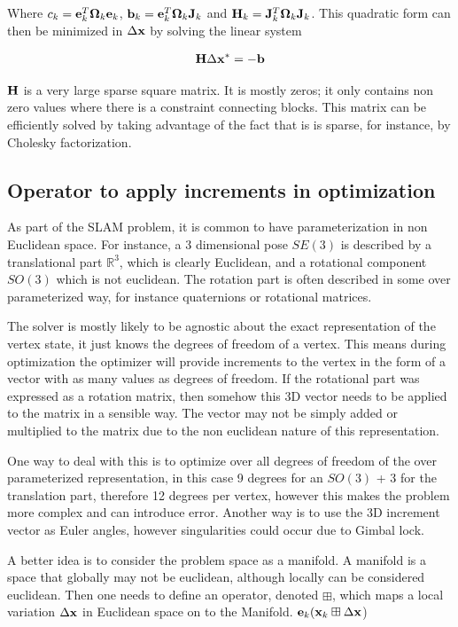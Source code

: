 Where $c_k = \mathbf e_k^T \mathbf \Omega_k \mathbf e_k$, $\mathbf b_k = \mathbf e_k^T \mathbf \Omega_k \mathbf J_k$ and $\mathbf H_k = \mathbf J_k^T \mathbf \Omega_k \mathbf J_k$. This quadratic form can then be minimized in $\Delta \mathbf x$ by solving the linear system

\begin{align}
   \mathbf H \Delta \mathbf x^* = -\mathbf b
\end{align}

$\mathbf H$ is a very large sparse square matrix.  It is mostly zeros; it only contains non zero values where there is a constraint connecting blocks.  This matrix can be efficiently solved by taking advantage of the fact that is is sparse, for instance, by Cholesky factorization.

\subsection{Operator to apply increments in optimization}
As part of the SLAM problem, it is common to have parameterization in non Euclidean space.  For instance, a 3 dimensional pose $SE(3)$ is described by a translational part $\mathbb{R}^3$, which is clearly Euclidean, and a rotational component $SO(3)$ which is not euclidean.  The rotation part is often described in some over parameterized way, for instance quaternions or rotational matrices.  

The solver is mostly likely to be agnostic about the exact representation of the vertex state, it just knows the degrees of freedom of a vertex.  This means during optimization the optimizer will provide increments to the vertex in the form of a vector with as many values as degrees of freedom.  If the rotational part was expressed as a rotation matrix, then somehow this 3D vector needs to be applied to the matrix in a sensible way.  The vector may not be simply added or multiplied to the matrix due to the non euclidean nature of this representation.

One way to deal with this is to optimize over all degrees of freedom of the over parameterized representation, in this case 9 degrees for an $SO(3)$ + 3 for the translation part, therefore 12 degrees per vertex, however this makes the problem more complex and can introduce error.  Another way is to use the 3D increment vector as Euler angles, however singularities could occur due to Gimbal lock.

A better idea is to consider the problem space as a manifold.  A manifold is a space that globally may not be euclidean, although locally can be considered euclidean.  Then one needs to define an operator, denoted $\boxplus$, which maps a local variation $\Delta\mathbf x$ in Euclidean space on to the Manifold. $\mathbf e_k(\mathbf x_k \boxplus \Delta\mathbf x$)

